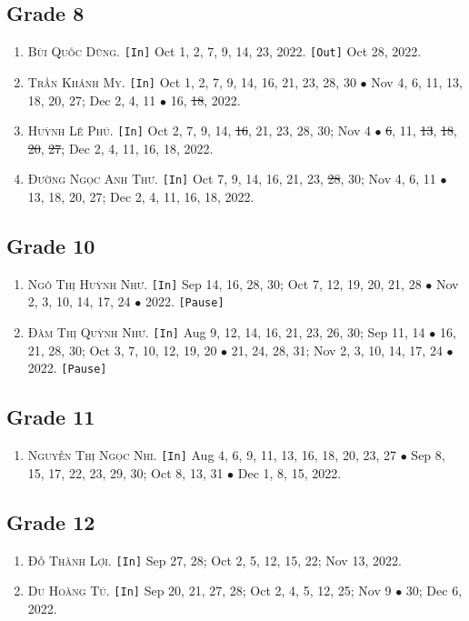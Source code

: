 \documentclass{article}
\numberwithin{equation}{section}
\begin{document}
\subsection{Grade 8}
\begin{enumerate}
	\item \textsc{Bùi Quốc Dũng.} \texttt{[In]} Oct 1, 2, 7, 9, 14, 23, 2022. \texttt{[Out]} Oct 28, 2022.
	\item \textsc{Trần Khánh My.} \texttt{[In]} Oct 1, 2, 7, 9, 14, 16, 21, 23, 28, 30 $\bullet$ Nov 4, 6, 11, 13, 18, 20, 27; Dec 2, 4, 11 $\bullet$ 16, \st{18}, 2022.
	\item \textsc{Huỳnh Lê Phú.} \texttt{[In]} Oct 2, 7, 9, 14, \st{16}, 21, 23, 28, 30; Nov 4 $\bullet$ \st{6}, 11, \st{13}, \st{18}, \st{20}, \st{27}; Dec 2, 4, 11, 16, 18, 2022.
	\item \textsc{Đường Ngọc Anh Thư.} \texttt{[In]} Oct 7, 9, 14, 16, 21, 23, \st{28}, 30; Nov 4, 6, 11 $\bullet$ 13, 18, 20, 27; Dec 2, 4, 11, 16, 18, 2022.
\end{enumerate}

\subsection{Grade 10}
\begin{enumerate}
	\item \textsc{Ngô Thị Huỳnh Như.} \texttt{[In]} Sep 14, 16, 28, 30; Oct 7, 12, 19, 20, 21, 28 $\bullet$ Nov 2, 3, 10, 14, 17, 24 $\bullet$ 2022. \texttt{[Pause]}
	\item \textsc{Đàm Thị Quỳnh Như.} \texttt{[In]} Aug 9, 12, 14, 16, 21, 23, 26, 30; Sep 11, 14 $\bullet$ 16, 21, 28, 30; Oct 3, 7, 10, 12, 19, 20 $\bullet$ 21, 24, 28, 31; Nov 2, 3, 10, 14, 17, 24 $\bullet$ 2022. \texttt{[Pause]}
\end{enumerate}

\subsection{Grade 11}
\begin{enumerate}
	\item \textsc{Nguyễn Thị Ngọc Nhi.} \texttt{[In]} Aug 4, 6, 9, 11, 13, 16, 18, 20, 23, 27 $\bullet$ Sep 8, 15, 17, 22, 23, 29, 30; Oct 8, 13, 31 $\bullet$ Dec 1, 8,  15, 2022.
\end{enumerate}

\subsection{Grade 12}
\begin{enumerate}
	\item \textsc{Đỗ Thành Lợi.} \texttt{[In]} Sep 27, 28; Oct 2, 5, 12, 15, 22; Nov 13, 2022.
	\item \textsc{Du Hoàng Tú.} \texttt{[In]} Sep 20, 21, 27, 28; Oct 2, 4, 5, 12, 25; Nov 9 $\bullet$ 30; Dec 6, 2022.
\end{enumerate}
\end{document}
